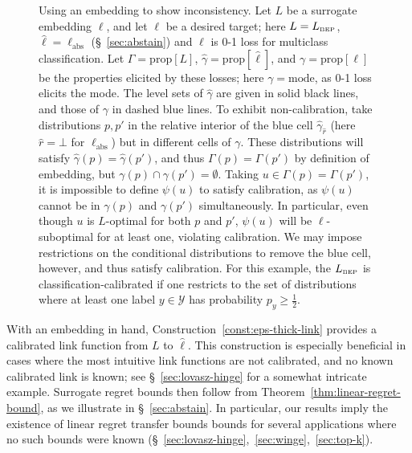 \documentclass[twoside,11pt]{article}
\newcommand{\prop}[1]{\mathrm{prop}[#1]}
\newcommand{\BEP}{L_{\text{\tiny BEP}}}
\newcommand{\ellabstain}{\ell_{\text{abs}}}
\newcommand{\mode}{\mathrm{mode}}
\newcommand{\Y}{\mathcal{Y}}
\begin{document}
\begin{figure}
	\begin{minipage}{0.28\linewidth}
    
\end{minipage}
\begin{minipage}{0.72\linewidth}
	\caption{Using an embedding to show inconsistency.
    Let $L$ be a surrogate embedding $\ell$, and let $\ell$ be a desired target; here $L=\BEP$, $\hat\ell = \ellabstain$ (\S~\ref{sec:abstain}) and $\ell$ is 0-1 loss for multiclass classification.
    Let $\Gamma = \prop{L}$, $\hat\gamma = \prop{\hat\ell}$, and $\gamma = \prop{\ell}$ be the properties elicited by these losses; here $\gamma = \mode$, as 0-1 loss elicits the mode.
    The level sets of $\hat\gamma$ are given in solid black lines, and those of $\gamma$ in dashed blue lines.
    To exhibit non-calibration, take distributions $p, p'$ in the relative interior of the blue cell $\hat \gamma_{\hat r}$ (here $\hat r=\bot$ for $\ellabstain$) but in different cells of $\gamma$.
    These distributions will satisfy $\hat\gamma(p) = \hat\gamma(p')$, and thus $\Gamma(p) = \Gamma(p')$ by definition of embedding, but $\gamma(p) \cap \gamma(p') = \emptyset$.
    Taking $u\in\Gamma(p)=\Gamma(p')$, it is impossible to define $\psi(u)$ to satisfy calibration, as $\psi(u)$ cannot be in $\gamma(p)$ and $\gamma(p')$ simultaneously.
    In particular, even though $u$ is $L$-optimal for both $p$ and $p'$, $\psi(u)$ will be $\ell$-suboptimal for at least one, violating calibration.
    We may impose restrictions on the conditional distributions to remove the blue cell, however, and thus satisfy calibration.
    For this example, the $\BEP$ is classification-calibrated if one restricts to the set of distributions where at least one label $y\in\Y$ has probability $p_y \geq \tfrac 1 2$.
	}
	\label{fig:abstain-intuition-inconsistent}
	\end{minipage}
\end{figure}

With an embedding in hand, Construction~\ref{const:eps-thick-link} provides a calibrated link function from $L$ to $\hat\ell$.
This construction is especially beneficial in cases where the most intuitive link functions are not calibrated, and no known calibrated link is known; see \S~\ref{sec:lovasz-hinge} for a somewhat intricate example.
Surrogate regret bounds then follow from Theorem~\ref{thm:linear-regret-bound}, as we illustrate in \S~\ref{sec:abstain}.
In particular, our results imply the existence of linear regret transfer bounds bounds for several applications where no such bounds were known (\S~\ref{sec:lovasz-hinge},~\ref{sec:winge},~\ref{sec:top-k}).
\end{document}
